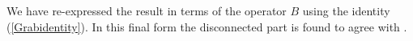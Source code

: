 \documentclass[11pt,a4paper]{article}
\begin{document}
We have  re-expressed the result in terms of the operator $B$ using the identity (\ref{Grabidentity}). In this final form the disconnected
part is found to agree with \cite{Grab}.
\end{document}

